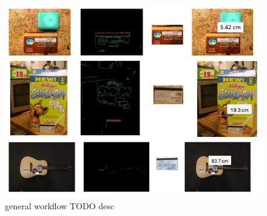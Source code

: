 \documentclass[10pt,twocolumn,letterpaper]{article}
\begin{document}
\begin{figure}
\begin{center}
	   \includegraphics[width=0.8\linewidth]{general-workflow}
\end{center}
   \caption{general workflow TODO desc}
\label{fig:general-workflow}
\end{figure}
\end{document}
